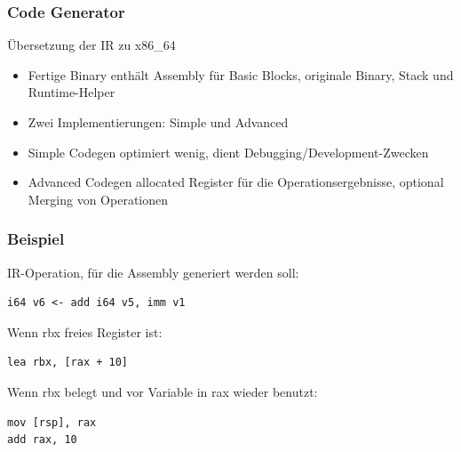 \begin{frame}
    \frametitle{Code Generator}{Übersetzung der IR zu x86\_64}


    \begin{itemize}
        \setlength{\itemsep}{1em}
        \item Fertige Binary enthält Assembly für Basic Blocks, originale Binary, Stack und Runtime-Helper
        \item Zwei Implementierungen: Simple und Advanced
        \item Simple Codegen optimiert wenig, dient Debugging/Development-Zwecken
        \item Advanced Codegen allocated Register für die Operationsergebnisse, optional Merging von Operationen
    \end{itemize}
\end{frame}
\clearpage

\begin{frame}[fragile]
    \frametitle{Beispiel}

    IR-Operation, für die Assembly generiert werden soll:
    \begin{lstlisting}[language=SbtIr]
i64 v6 <- add i64 v5, imm v1
    \end{lstlisting}

    Wenn rbx freies Register ist:
    \begin{lstlisting}[language={[x86masm]Assembler}]
lea rbx, [rax + 10]
    \end{lstlisting}

    Wenn rbx belegt und vor Variable in rax wieder benutzt:
    \begin{lstlisting}[language={[x86masm]Assembler}]
mov [rsp], rax
add rax, 10
    \end{lstlisting}
\end{frame}
\clearpage

